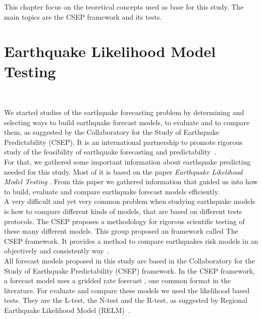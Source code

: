 This chapter focus on the teoretical concepts used as base for this study. The main topics are the CSEP framework and its tests.\\

\section{Earthquake Likelihood Model Testing}~\label{testing}

We started studies of the earthquake forecasting problem by determining and selecting ways to build earthquake forecast models, to evaluate and to compare them, as suggested by the Collaboratory for the Study of Earthquake Predictability (CSEP). It is an international partnership to promote rigorous study of the feasibility of earthquake forecasting and predictability~\cite{ecta14}.\\

For that, we gathered some important information about earthquake predicting needed for this study. Most of it is based on the paper {\it Earthquake Likelihood Model Testing} \cite{schorlemmer2007earthquake}. From this paper we gathered information that guided us into how to build, evaluate and compare earthquake forecast models efficiently.\\

A very difficult and yet very common problem when studying earthquake models is how to compare different kinds of models, that are based on different tests protocols. The CSEP proposes a methodology for rigorous scientific testing of these many different models. This group proposed an framework called The CSEP framework. It provides a method to compare earthquakes risk models in an objectively and consistently way~\cite{ecta14}.\\

All forecast models proposed in this study are based in the Collaboratory for the Study of Earthquake Predictability (CSEP) framework. In the CSEP framework, a forecast model uses a gridded rate forecast \cite{zechar2010evaluating}, one common format in the literature. For evaluate and compare these models we used the likelihood based tests. They are the L-test, the N-test and the R-test, as suggested by Regional Earthquake Likelihood Model (RELM)~\cite{schorlemmer2007earthquake}.\\

